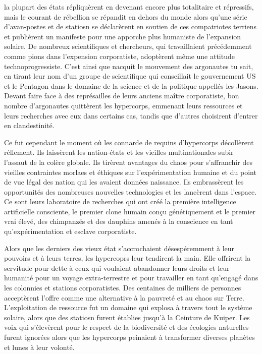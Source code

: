 la plupart des états répliquèrent en devenant encore plus totalitaire et répressifs, mais le courant de rébellion se répandit en dehors du monde alors qu'une série d'avan-postes et de statiosn se déclarèrent en soutien de ces compatriotes terriens et publièrent un manifeste pour une apporche plus humaniste de l'expansion solaire. De nombreux scientifiques et chercheurs, qui travaillaient précédemment comme pions dans l'expension corporatiste, adoptèrent même une attitude technoprogressiste. C'est ainsi que nacquit le mouvement des argonautes tu sait, en tirant leur nom d'un groupe de scientifique qui conseillait le gouvernement US et le Pentagon dans le domaine de la science et de la politique appellés les Jasons. Devant faire face à des représailles de leurs anciens maître corporatiste, bon nombre d'argonautes quittèrent les hypercorps, emmenant leurs ressources et leurs recherches avec eux dans certains cas, tandis que d'autres choisirent d'entrer en clandestinité. 

Ce fut cependant le moment où les connarde de requins d'hypercorps décollèrent réllement. Ils laissèrent les nation-états et les vieilles multinationales subir l'assaut de la colère globale. Ils tirèrent avantages du chaos pour s'affranchir des vieilles contraintes morlaes et éthiques sur l'expérimentation humaine et du point de vue légal des nation qui les avaient données naissance. Ils embrassèrent les opportunités des nombreuses nouvelles technologies et les lancèrent dans l'espace. Ce sont leurs laboratoire de recherches qui ont créé la première intelligence artificielle consciente, le premier clone humain conçu génétiquement et le premier vrai élevé, des chimpanzés et des dauphins amenés à la conscience en tant qu'expérimentation et esclave corporatiste. 

Alors que les derniers des vieux état s'accrochaient désespéremment à leur pouvoirs et à leurs terres, les hypercoprs leur tendirent la main. Elle offrirent la servitude pour dette à ceux qui voulaient abandonner leurs droits et leur humanité pour un voyage extra-terrestre et pour travailler en tant qu'engagé dans les colonnies et stations corporatistes. Des centaines de milliers de personnes acceptèrent l'offre comme une alternative à la pauvreté et au chaos sur Terre. L'exploitation de ressource fut un domaine qui explosa à travers tout le système solaire, alors que des statiosn furent établies jusqu'à la Ceinture de Kuiper. Les voix qui s'élevèrent pour le respect de la biodiversité et des écologies naturelles furent ignorées alors que les hypercorps peinaient à transformer diverses planètes et lunes à leur volonté. 

